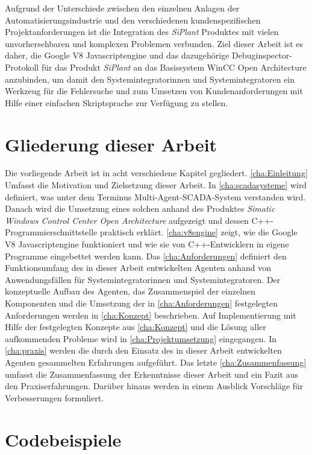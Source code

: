 Aufgrund der Unterschiede zwischen den einzelnen Anlagen der Automatisierungsindustrie und den verschiedenen kundenspezifischen 
Projektanforderungen ist die Integration des \textit{SiPlant} Produktes mit vielen unvorhersehbaren und komplexen Problemen 
verbunden. Ziel dieser Arbeit ist es daher, die Google V8 Javascriptengine und das dazugehörige Debuginspector-Protokoll 
für das Produkt \textit{SiPlant} an das Basissystem WinCC Open Architecture anzubinden, um damit den Systemintegratorinnen und Systemintegratoren
ein Werkzeug für die Fehlersuche und zum Umsetzen von Kundenanforderungen mit Hilfe einer einfachen Skriptsprache zur Verfügung zu 
stellen.

\section{Gliederung dieser Arbeit}

Die vorliegende Arbeit ist in acht verschiedene Kapitel gegliedert. \autoref{cha:Einleitung} Umfasst die Motivation und Zielsetzung dieser
Arbeit.
In \autoref{cha:scadasysteme} wird definiert, was unter dem Terminus Multi-Agent-SCADA-System verstanden wird. Danach wird die Umsetzung
eines solchen anhand des Produktes \textit{Simatic Windows Control Center Open Architecture} aufgezeigt und dessen C++-Programmierschnittstelle
praktisch erklärt.
\autoref{cha:v8engine} zeigt, wie die Google V8 Javascriptengine funktioniert und wie sie von C++-Entwicklern in eigene Programme eingebettet werden
kann.
Das \autoref{cha:Anforderungen} definiert den Funktionsumfang des in dieser Arbeit entwickelten Agenten anhand von Anwendungsfällen für Systemintegratorinnen und
Systemintegratoren.
Der konzeptuelle Aufbau des Agenten, das Zusammenspiel der einzelnen Komponenten und die Umsetzung der in \autoref{cha:Anforderungen} festgelegten Anforderungen
werden in \autoref{cha:Konzept} beschrieben.
Auf Implementierung mit Hilfe der festgelegten Konzepte aus \autoref{cha:Konzept} und die Lösung aller aufkommenden Probleme wird
in \autoref{cha:Projektumsetzung} eingegangen.
In \autoref{cha:praxis} werden die durch den Einsatz des in dieser Arbeit entwickelten Agenten gesammelten Erfahrungen aufgeführt.
Das letzte \autoref{cha:Zusammenfassung} umfasst die Zusammenfassung der Erkenntnisse dieser Arbeit und ein Fazit aus den Praxiserfahrungen.
Darüber hinaus werden in einem Ausblick Vorschläge für Verbesserungen formuliert.

\section{Codebeispiele}

